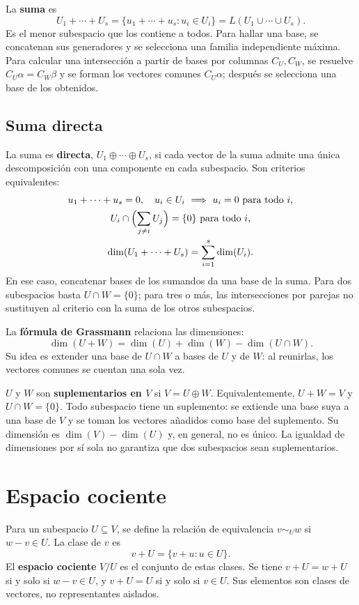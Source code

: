 La \textbf{suma} es
\[
 U_1+\cdots+U_s=\{u_1+\cdots+u_s:u_i\in U_i\}
             =L(U_1\cup\cdots\cup U_s).
\]
Es el menor subespacio que los contiene a todos. Para hallar una base,
se concatenan sus generadores y se selecciona una familia independiente máxima.
Para calcular una intersección a partir de bases por columnas $C_U,C_W$,
se resuelve $C_U\alpha=C_W\beta$ y se forman los vectores comunes
$C_U\alpha$; después se selecciona una base de los obtenidos.

\subsection*{Suma directa}

La suma es \textbf{directa}, $U_1\oplus\cdots\oplus U_s$, si cada vector
de la suma admite una única descomposición con una componente en cada
subespacio. Son criterios equivalentes:
\[
 \begin{gathered}
 u_1+\cdots+u_s=0,\quad u_i\in U_i\ \Longrightarrow\ u_i=0\text{ para todo }i,\\
 U_i\cap\Bigl(\sum_{j\ne i}U_j\Bigr)=\{0\}\text{ para todo }i,\\
 \dim(U_1+\cdots+U_s)=\sum_{i=1}^s\dim(U_i).
 \end{gathered}
\]
En ese caso, concatenar bases de los sumandos da una base de la suma.
Para dos subespacios basta $U\cap W=\{0\}$; para tres o más,
las intersecciones por parejas no sustituyen al criterio con la suma
de los otros subespacios.

La \textbf{fórmula de Grassmann} relaciona las dimensiones:
\[
 \boxed{\dim(U+W)=\dim(U)+\dim(W)-\dim(U\cap W).}
\]
Su idea es extender una base de $U\cap W$ a bases de $U$ y de $W$:
al reunirlas, los vectores comunes se cuentan una sola vez.

$U$ y $W$ son \textbf{suplementarios en $V$} si $V=U\oplus W$.
Equivalentemente, $U+W=V$ y $U\cap W=\{0\}$.
Todo subespacio tiene un suplemento: se extiende una base suya a una
base de $V$ y se toman los vectores añadidos como base del suplemento.
Su dimensión es $\dim(V)-\dim(U)$ y, en general, no es único.
La igualdad de dimensiones por sí sola no garantiza que dos subespacios
sean suplementarios.

\section{Espacio cociente}
\label{sec:cociente}

Para un subespacio $U\subseteq V$, se define la relación de equivalencia
$v\sim_U w$ si $w-v\in U$. La clase de $v$ es
\[
 v+U=\{v+u:u\in U\}.
\]
El \textbf{espacio cociente} $V/U$ es el conjunto de estas clases.
Se tiene $v+U=w+U$ si y solo si $w-v\in U$, y $v+U=U$ si y solo si
$v\in U$. Sus elementos son clases de vectores, no representantes aislados.

